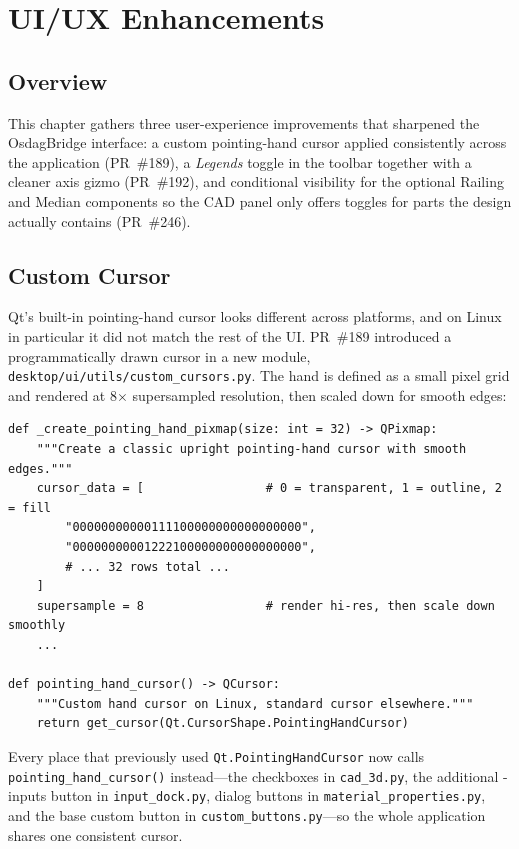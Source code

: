\chapter{UI/UX Enhancements}
\label{ch:ui}

\section{Overview}
This chapter gathers three user-experience improvements that sharpened the OsdagBridge
interface: a custom pointing-hand cursor applied consistently across the application
(PR~\#189), a \emph{Legends} toggle in the toolbar together with a cleaner axis gizmo
(PR~\#192), and conditional visibility for the optional Railing and Median components so the
CAD panel only offers toggles for parts the design actually contains (PR~\#246).

\section{Custom Cursor}
Qt's built-in pointing-hand cursor looks different across platforms, and on Linux in particular
it did not match the rest of the UI. PR~\#189 introduced a programmatically drawn cursor in a
new module, \texttt{desktop/ui/utils/custom\_cursors.py}. The hand is defined as a small pixel
grid and rendered at 8$\times$ supersampled resolution, then scaled down for smooth edges:

\begin{lstlisting}[caption={Programmatically generated pointing-hand cursor (\texttt{custom\_cursors.py}).},label={lst:cursor}]
def _create_pointing_hand_pixmap(size: int = 32) -> QPixmap:
    """Create a classic upright pointing-hand cursor with smooth edges."""
    cursor_data = [                 # 0 = transparent, 1 = outline, 2 = fill
        "00000000000111100000000000000000",
        "00000000001222100000000000000000",
        # ... 32 rows total ...
    ]
    supersample = 8                 # render hi-res, then scale down smoothly
    ...

def pointing_hand_cursor() -> QCursor:
    """Custom hand cursor on Linux, standard cursor elsewhere."""
    return get_cursor(Qt.CursorShape.PointingHandCursor)
\end{lstlisting}

Every place that previously used \texttt{Qt.PointingHandCursor} now calls
\texttt{pointing\_hand\_cursor()} instead---the checkboxes in \texttt{cad\_3d.py}, the additional
-inputs button in \texttt{input\_dock.py}, dialog buttons in \texttt{material\_properties.py},
and the base custom button in \texttt{custom\_buttons.py}---so the whole application shares one
consistent cursor.

